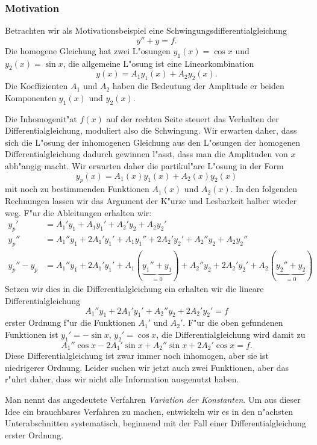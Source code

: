 \subsubsection{Motivation}
Betrachten wir als Motivationsbeispiel eine Schwingungsdifferentialgleichung
\[
y''+y=f.
\]
Die homogene Gleichung hat zwei L"osungen $y_1(x)=\cos x$ und $y_2(x)=\sin x$,
die allgemeine L"osung ist eine Linearkombination 
\[
y(x)=A_1y_1(x)+A_2y_2(x).
\]
Die Koeffizienten $A_1$ und $A_2$ haben die Bedeutung der Amplitude er
beiden Komponenten $y_1(x)$ und $y_2(x)$.

Die Inhomogenit"at $f(x)$ auf der rechten Seite steuert das Verhalten
der Differentialgleichung, moduliert also die Schwingung.
Wir erwarten daher, dass sich die L"osung der inhomogenen Gleichung
aus den L"osungen der homogenen Differentialgleichung dadurch gewinnen
l"asst, dass man die Amplituden von $x$ abh"angig macht.
Wir erwarten daher die partikul"are L"osung in der Form
\[
y_p(x)=A_1(x)y_1(x)+A_2(x)y_2(x)
\]
mit noch zu bestimmenden Funktionen $A_1(x)$ und $A_2(x)$.
In den folgenden Rechnungen lassen wir das Argument der K"urze und Lesbarkeit
halber wieder weg.
F"ur die Ableitungen erhalten wir:
\begin{align*}
y_p'
&=
A_1'y_1+A_1y_1'+A_2'y_2+A_2y_2'
\\
y_p''
&=
A_1''y_1+2A_1'y_1'+A_1y_1''+2A_2'y_2'+A_2''y_2+A_2y_2''
\\
y_p''-y_p
&=
A_1''y_1+2A_1'y_1'+A_1(\underbrace{y_1''+y_1}_{\displaystyle =0})
+
A_2''y_2+2A_2'y_2'+A_2(\underbrace{y_2''+y_2}_{\displaystyle =0})
\end{align*}
Setzen wir dies in die Differentialgleichung ein erhalten wir die
lineare Differentialgleichung 
\[
A_1''y_1+2A_1'y_1' +A_2''y_2+2A_2'y_2'=f
\]
erster Ordnung f"ur die Funktionen $A_1'$ und $A_2'$.
F"ur die oben gefundenen Funktionen ist $y_1'=-\sin x$, $y_2'=\cos x$,
die Differentialgleichung wird damit zu
\[
A_1''\cos x -2A_1'\sin x +A_2''\sin x+2A_2'\cos x=f.
\]
Diese Differentialgleichung ist zwar immer noch inhomogen, aber sie
ist niedrigerer Ordnung.
Leider suchen wir jetzt auch zwei Funktionen, aber das r"uhrt daher, dass
wir nicht alle Information ausgenutzt haben.

Man nennt das angedeutete Verfahren {\em Variation der Konstanten}.
%
Um aus dieser Idee ein brauchbares Verfahren zu machen, entwickeln wir es
in den n"achsten Unterabschnitten systematisch, beginnend mit der Fall
einer Differentialgleichung erster Ordnung.

